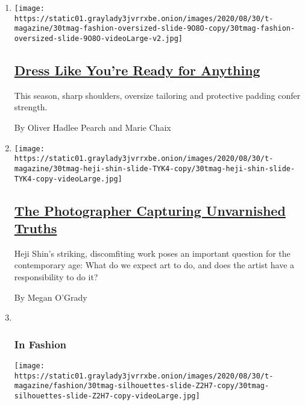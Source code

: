 \begin{enumerate}
\def\labelenumi{\arabic{enumi}.}
\item
  \texttt{[image: https://static01.graylady3jvrrxbe.onion/images/2020/08/30/t-magazine/30tmag-fashion-oversized-slide-9O8O-copy/30tmag-fashion-oversized-slide-9O8O-videoLarge-v2.jpg]}

  \hypertarget{dress-like-youre-ready-for-anything}{%
  \subsection{\texorpdfstring{\href{/2020/08/25/t-magazine/fall-womens-fashion-sharp-oversize-tailoring.html}{Dress
  Like You're Ready for
  Anything}}{Dress Like You're Ready for Anything}}\label{dress-like-youre-ready-for-anything}}

  This season, sharp shoulders, oversize tailoring and protective
  padding confer strength.

  By Oliver Hadlee Pearch and Marie Chaix
\item
  \texttt{[image: https://static01.graylady3jvrrxbe.onion/images/2020/08/30/t-magazine/30tmag-heji-shin-slide-TYK4-copy/30tmag-heji-shin-slide-TYK4-copy-videoLarge.jpg]}

  \hypertarget{the-photographer-capturing-unvarnished-truths}{%
  \subsection{\texorpdfstring{\href{/2020/08/27/t-magazine/heji-shin-photographer-babies.html}{The
  Photographer Capturing Unvarnished
  Truths}}{The Photographer Capturing Unvarnished Truths}}\label{the-photographer-capturing-unvarnished-truths}}

  Heji Shin's striking, discomfiting work poses an important question
  for the contemporary age: What do we expect art to do, and does the
  artist have a responsibility to do it?

  By Megan O'Grady
\item ~
  \hypertarget{in-fashion}{%
  \subsubsection{In Fashion}\label{in-fashion}}

  \texttt{[image: https://static01.graylady3jvrrxbe.onion/images/2020/08/30/t-magazine/fashion/30tmag-silhouettes-slide-Z2H7-copy/30tmag-silhouettes-slide-Z2H7-copy-videoLarge.jpg]}

  \hypertarget{voluminous-fashions-for-dreamy-fall-nights}{%
}
\end{enumerate}

